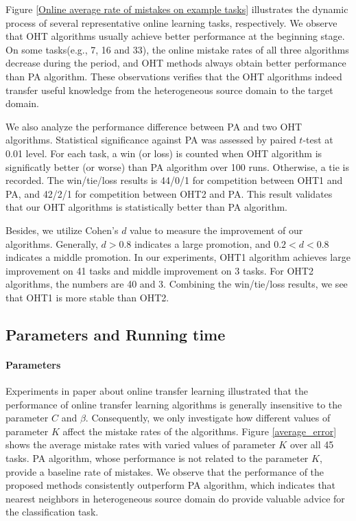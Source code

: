 \documentclass{article} %
\theoremstyle{remark}
\theoremstyle{definition}
\begin{document}
Figure \ref{Online average rate of mistakes on example tasks} illustrates the dynamic process of several representative online learning tasks, respectively.
We observe that OHT algorithms usually achieve better performance at the beginning stage.
On some tasks(e.g., 7, 16 and 33), the online mistake rates of all three algorithms decrease during the period, and OHT methods always obtain better performance than PA algorithm.
These observations verifies that the OHT algorithms indeed transfer useful knowledge from the heterogeneous source domain to the target domain. 

We also analyze the performance difference between PA and two OHT algorithms.
Statistical significance against PA was assessed by paired $t$-test at 0.01 level.
For each task, a win (or loss) is counted when OHT algorithm is significatly better (or worse) than PA algorithm over 100 runs.
Otherwise, a tie is recorded.
The win/tie/loss results is 44/0/1 for competition between OHT1 and PA, and 42/2/1 for competition between  OHT2 and PA.
This result validates that our OHT algorithms is statistically better than PA algorithm.

Besides, we utilize Cohen's $d$ value to measure the improvement of our algorithms.
Generally, $d>0.8$ indicates a large promotion, and $0.2<d<0.8$ indicates a middle promotion.
In our experiments, OHT1 algorithm achieves large improvement on 41 tasks and middle improvement on 3 tasks.
For OHT2 algorithms, the numbers are 40 and 3.
Combining the win/tie/loss results, we see that OHT1 is more stable than OHT2.


\subsection{Parameters and Running time}
\paragraph{Parameters}
Experiments in paper about online transfer learning illustrated that the performance of online transfer learning algorithms is generally insensitive to the parameter $C$ and $\beta$.
Consequently, we only investigate how different values of parameter $K$ affect the mistake rates of the algorithms.
Figure \ref{average_error} shows the average mistake rates with varied values of parameter $K$ over all 45 tasks.
PA algorithm, whose performance is not related to the parameter $K$, provide a baseline rate of mistakes.
We observe that the performance of the proposed methods consistently outperform PA algorithm, which indicates that nearest neighbors in heterogeneous source domain do provide valuable advice for the classification task.
\end{document}
